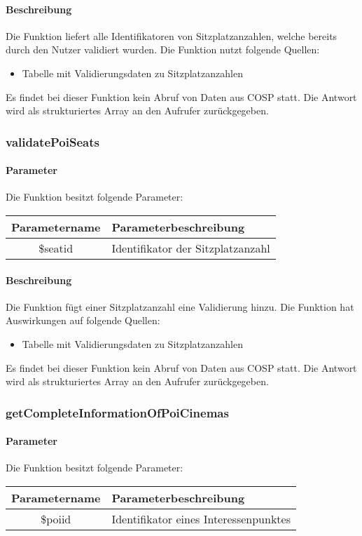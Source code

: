 \paragraph{Beschreibung} Die Funktion liefert alle Identifikatoren von Sitzplatzanzahlen, welche bereits durch den Nutzer validiert wurden. Die Funktion nutzt folgende Quellen:
\begin{itemize}
	\item Tabelle mit Validierungsdaten zu Sitzplatzanzahlen
\end{itemize}
Es findet bei dieser Funktion kein Abruf von Daten aus {\glqq COSP\grqq} statt. Die Antwort wird als strukturiertes Array an den Aufrufer zurückgegeben.
\subsubsection{validatePoiSeats}
\paragraph{Parameter} Die Funktion besitzt folgende Parameter:
\begin{table}[H]
	\begin{tabular}{|c|p{11cm}|}
		\hline
		\textbf{Parametername} & \textbf{Parameterbeschreibung} \\ \hline
		\$seatid & Identifikator der Sitzplatzanzahl \\ \hline
	\end{tabular}
\end{table}
\paragraph{Beschreibung} Die Funktion fügt einer Sitzplatzanzahl eine Validierung hinzu. Die Funktion hat Auswirkungen auf folgende Quellen:
\begin{itemize}
	\item Tabelle mit Validierungsdaten zu Sitzplatzanzahlen
\end{itemize}
Es findet bei dieser Funktion kein Abruf von Daten aus {\glqq COSP\grqq} statt. Die Antwort wird als strukturiertes Array an den Aufrufer zurückgegeben.
\subsubsection{getCompleteInformationOfPoiCinemas}
\paragraph{Parameter} Die Funktion besitzt folgende Parameter:
\begin{table}[H]
	\begin{tabular}{|c|p{11cm}|}
		\hline
		\textbf{Parametername} & \textbf{Parameterbeschreibung} \\ \hline
		\$poiid      & Identifikator eines Interessenpunktes \\ \hline
	\end{tabular}
\end{table}
